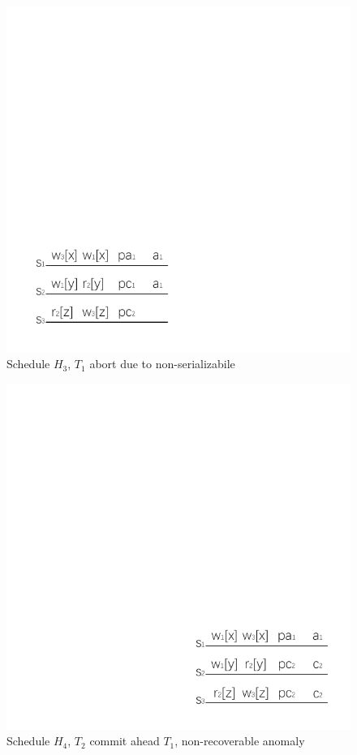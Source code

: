 \documentclass[conference]{IEEEtran}
\begin{document}
\begin{figure}[tbp]
  \centerline{\includegraphics[scale=1]{figure/schedule_not_serializabile.pdf}}
  \caption{Schedule ${H_3}$, ${T_1}$ abort due to non-serializabile}
  \label{fig:schedule_abort_example}
\end{figure}

\begin{figure}[tbp]
  \centerline{\includegraphics[scale=1]{figure/schedule_not_recoverable.pdf}}
  \caption{Schedule ${H_4}$, ${T_2}$ commit ahead ${T_1}$, non-recoverable anomaly}
  \label{fig:schedule_not_recoverable}
\end{figure}
\end{document}
